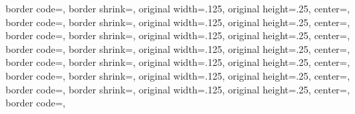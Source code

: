 {{	border code=\pgfsetlinewidth{.5pt}\pgfstroke,%
  }%
  {%
	border shrink=\pgfpageoptionborder,%
	original width=.125\pgfpageoptionheight,%
	original height=.25\pgfpageoptionwidth,%
	center=\pgfpoint{.5\pgfphysicalwidth}{.25\pgfphysicalheight},%
	border code=\pgfsetlinewidth{.5pt}\pgfstroke,%
	}%
  {%
	border shrink=\pgfpageoptionborder,%
	original width=.125\pgfpageoptionheight,%
	original height=.25\pgfpageoptionwidth,%
	center=\pgfpoint{.25\pgfphysicalwidth}{.25\pgfphysicalheight},%
	border code=\pgfsetlinewidth{.5pt}\pgfstroke,%
  }%
  {%
	border shrink=\pgfpageoptionborder,%
	original width=.125\pgfpageoptionheight,%
	original height=.25\pgfpageoptionwidth,%
	center=\pgfpoint{0pt}{.25\pgfphysicalheight},%
	border code=\pgfsetlinewidth{.5pt}\pgfstroke,%
  }%
  {%
	border shrink=\pgfpageoptionborder,%
	original width=.125\pgfpageoptionheight,%
	original height=.25\pgfpageoptionwidth,%
	center=\pgfpoint{.75\pgfphysicalwidth}{.125\pgfphysicalheight},%
	border code=\pgfsetlinewidth{.5pt}\pgfstroke,%
  }%
  {%
	border shrink=\pgfpageoptionborder,%
	original width=.125\pgfpageoptionheight,%
	original height=.25\pgfpageoptionwidth,%
	center=\pgfpoint{.5\pgfphysicalwidth}{.125\pgfphysicalheight},%
	border code=\pgfsetlinewidth{.5pt}\pgfstroke,%
	}%
  {%
	border shrink=\pgfpageoptionborder,%
	original width=.125\pgfpageoptionheight,%
	original height=.25\pgfpageoptionwidth,%
	center=\pgfpoint{.25\pgfphysicalwidth}{.125\pgfphysicalheight},%
	border code=\pgfsetlinewidth{.5pt}\pgfstroke,%
  }%
  {%
	border shrink=\pgfpageoptionborder,%
	original width=.125\pgfpageoptionheight,%
	original height=.25\pgfpageoptionwidth,%
	center=\pgfpoint{0pt}{.125\pgfphysicalheight},%
	border code=\pgfsetlinewidth{.5pt}\pgfstroke,%
  }%
}%